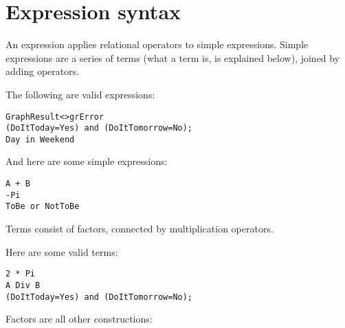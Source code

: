 \documentclass{report}
\begin{document}
\section{Expression syntax}
An expression applies relational operators to simple expressions. Simple
expressions are a series of terms (what a term is, is explained below), joined by 
adding operators.

The following are valid expressions:
\begin{verbatim}
GraphResult<>grError
(DoItToday=Yes) and (DoItTomorrow=No);
Day in Weekend
\end{verbatim}
And here are some simple expressions:
\begin{verbatim}
A + B
-Pi
ToBe or NotToBe
\end{verbatim}
Terms consist of factors, connected by multiplication operators.

Here are some valid terms:
\begin{verbatim}
2 * Pi
A Div B
(DoItToday=Yes) and (DoItTomorrow=No);
\end{verbatim}
Factors are all other constructions:


\end{document}
